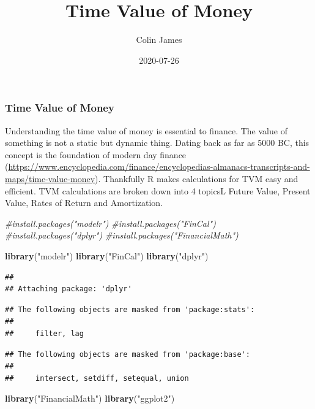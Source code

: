 \documentclass[]{article}
\title{Time Value of Money}
\author{Colin James}
\date{2020-07-26}
\newenvironment{Shaded}{\begin{snugshade}}{\end{snugshade}}
\newcommand{\CommentTok}[1]{\textcolor[rgb]{0.56,0.35,0.01}{\textit{#1}}}
\newcommand{\KeywordTok}[1]{\textcolor[rgb]{0.13,0.29,0.53}{\textbf{#1}}}
\newcommand{\NormalTok}[1]{#1}
\newcommand{\StringTok}[1]{\textcolor[rgb]{0.31,0.60,0.02}{#1}}
\begin{document}
\maketitle

\hypertarget{time-value-of-money}{%
\subsubsection{Time Value of Money}\label{time-value-of-money}}

Understanding the time value of money is essential to finance. The value
of something is not a static but dynamic thing. Dating back as far as
5000 BC, this concept is the foundation of modern day finance
(\url{https://www.encyclopedia.com/finance/encyclopedias-almanacs-transcripts-and-maps/time-value-money}).
Thankfully R makes calculations for TVM easy and efficient. TVM
calculations are broken down into 4 topicsL Future Value, Present Value,
Rates of Return and Amortization.

\begin{Shaded}
\begin{Highlighting}[]
\CommentTok{#install.packages("modelr")}
\CommentTok{#install.packages("FinCal")}
\CommentTok{#install.packages("dplyr")}
\CommentTok{#install.packages("FinancialMath")}

\KeywordTok{library}\NormalTok{(}\StringTok{"modelr"}\NormalTok{)}
\KeywordTok{library}\NormalTok{(}\StringTok{"FinCal"}\NormalTok{)}
\KeywordTok{library}\NormalTok{(}\StringTok{"dplyr"}\NormalTok{)}
\end{Highlighting}
\end{Shaded}

\begin{verbatim}
## 
## Attaching package: 'dplyr'
\end{verbatim}

\begin{verbatim}
## The following objects are masked from 'package:stats':
## 
##     filter, lag
\end{verbatim}

\begin{verbatim}
## The following objects are masked from 'package:base':
## 
##     intersect, setdiff, setequal, union
\end{verbatim}

\begin{Shaded}
\begin{Highlighting}[]
\KeywordTok{library}\NormalTok{(}\StringTok{"FinancialMath"}\NormalTok{)}
\KeywordTok{library}\NormalTok{(}\StringTok{"ggplot2"}\NormalTok{)}
\end{Highlighting}
\end{Shaded}
\end{document}
